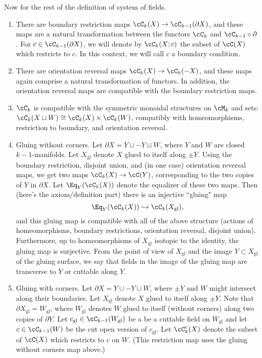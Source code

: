 \documentclass[11pt,leqno]{amsart}
\def\du{\sqcup}
\def\bd{\partial}
\def\sgl{_\mathrm{gl}}
\begin{document}
Now for the rest of the definition of system of fields.
\begin{enumerate}
\item There are boundary restriction maps $\cC_k(X) \to \cC_{k-1}(\bd X)$, 
and these maps are a natural
transformation between the functors $\cC_k$ and $\cC_{k-1}\circ\bd$.
For $c \in \cC_{k-1}(\bd X)$, we will denote by $\cC_k(X; c)$ the subset of 
$\cC(X)$ which restricts to $c$.
In this context, we will call $c$ a boundary condition.
\item There are orientation reversal maps $\cC_k(X) \to \cC_k(-X)$, and these maps
again comprise a natural transformation of functors.
In addition, the orientation reversal maps are compatible with the boundary restriction maps.
\item $\cC_k$ is compatible with the symmetric monoidal
structures on $\cM_k$ and sets: $\cC_k(X \du W) \cong \cC_k(X)\times \cC_k(W)$,
compatibly with homeomorphisms, restriction to boundary, and orientation reversal.
\item Gluing without corners.
Let $\bd X = Y \du -Y \du W$, where $Y$ and $W$ are closed $k{-}1$-manifolds.
Let $X\sgl$ denote $X$ glued to itself along $\pm Y$.
Using the boundary restriction, disjoint union, and (in one case) orientation reversal
maps, we get two maps $\cC_k(X) \to \cC(Y)$, corresponding to the two
copies of $Y$ in $\bd X$.
Let $\Eq_Y(\cC_k(X))$ denote the equalizer of these two maps.
Then (here's the axiom/definition part) there is an injective ``gluing" map
\[
	\Eq_Y(\cC_k(X)) \hookrightarrow \cC_k(X\sgl) ,
\]
and this gluing map is compatible with all of the above structure (actions
of homeomorphisms, boundary restrictions, orientation reversal, disjoint union).
Furthermore, up to homeomorphisms of $X\sgl$ isotopic to the identity,
the gluing map is surjective.
From the point of view of $X\sgl$ and the image $Y \subset X\sgl$ of the 
gluing surface, we say that fields in the image of the gluing map
are transverse to $Y$ or cuttable along $Y$.
\item Gluing with corners.
Let $\bd X = Y \cup -Y \cup W$, where $\pm Y$ and $W$ might intersect along their boundaries.
Let $X\sgl$ denote $X$ glued to itself along $\pm Y$.
Note that $\bd X\sgl = W\sgl$, where $W\sgl$ denotes $W$ glued to itself
(without corners) along two copies of $\bd Y$.
Let $c\sgl \in \cC_{k-1}(W\sgl)$ be a be a cuttable field on $W\sgl$ and let
$c \in \cC_{k-1}(W)$ be the cut open version of $c\sgl$.
Let $\cC^c_k(X)$ denote the subset of $\cC(X)$ which restricts to $c$ on $W$.
(This restriction map uses the gluing without corners map above.)

\end{enumerate}
\end{document}
